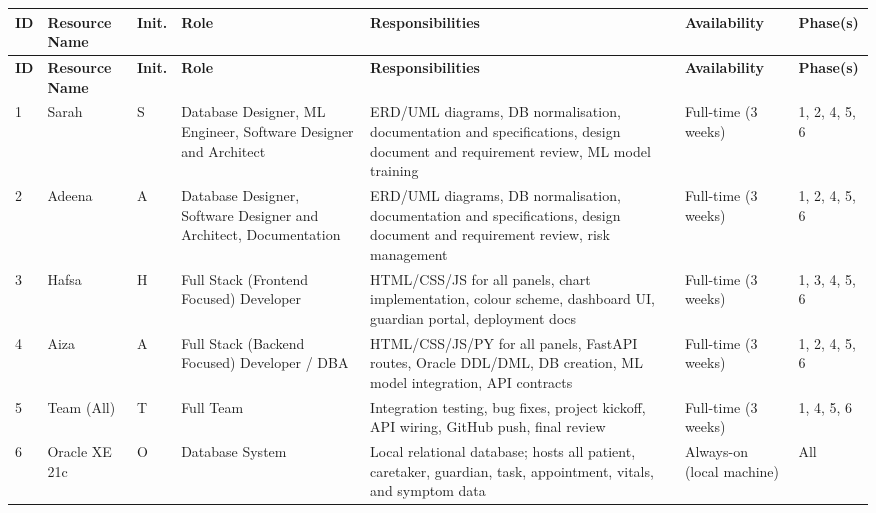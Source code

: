 \documentclass[12pt,a4paper]{article}
\begin{document}
\begin{longtable}{|p{0.5cm}|p{2.5cm}|p{1cm}|p{3cm}|p{3.5cm}|p{2cm}|p{1.5cm}|}
    \hline
    \textbf{ID} & \textbf{Resource Name} & \textbf{Init.} & \textbf{Role} & \textbf{Responsibilities} & \textbf{Availability} & \textbf{Phase(s)} \\
    \hline
    \endfirsthead
    \hline
    \textbf{ID} & \textbf{Resource Name} & \textbf{Init.} & \textbf{Role} & \textbf{Responsibilities} & \textbf{Availability} & \textbf{Phase(s)} \\
    \hline
    \endhead
 
    1 & Sarah & S &
        Database Designer, ML Engineer, Software Designer and Architect &
        ERD/UML diagrams, DB normalisation, documentation and specifications, design document and requirement review, ML model training &
        Full-time (3 weeks) & 1, 2, 4, 5, 6 \\
    \hline
 
    2 & Adeena & A &
        Database Designer, Software Designer and Architect, Documentation &
        ERD/UML diagrams, DB normalisation, documentation and specifications, design document and requirement review, risk management &
        Full-time (3 weeks) & 1, 2, 4, 5, 6 \\
    \hline
 
    3 & Hafsa & H &
        Full Stack (Frontend Focused) Developer &
        HTML/CSS/JS for all panels, chart implementation, colour scheme, dashboard UI, guardian portal, deployment docs &
        Full-time (3 weeks) & 1, 3, 4, 5, 6 \\
    \hline
 
    4 & Aiza & A &
        Full Stack (Backend Focused) Developer / DBA &
        HTML/CSS/JS/PY for all panels, FastAPI routes, Oracle DDL/DML, DB creation, ML model integration, API contracts &
        Full-time (3 weeks) & 1, 2, 4, 5, 6 \\
    \hline
 
    5 & Team (All) & T &
        Full Team &
        Integration testing, bug fixes, project kickoff, API wiring, GitHub push, final review &
        Full-time (3 weeks) & 1, 4, 5, 6 \\
    \hline
 
    6 & Oracle XE 21c & O &
        Database System &
        Local relational database; hosts all patient, caretaker, guardian, task, appointment, vitals, and symptom data &
        Always-on (local machine) & All \\
    \hline
 

\end{longtable}
\end{document}
